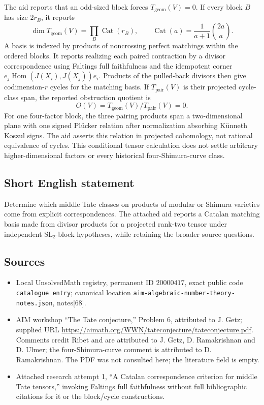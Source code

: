 \documentclass[11pt]{article}
\begin{document}
The aid reports that an odd-sized block forces \(T_{\mathrm{geom}}(V)=0\). If every block \(B\) has size \(2r_B\), it reports
\[
\dim T_{\mathrm{geom}}(V)=\prod_B\operatorname{Cat}(r_B),\qquad
\operatorname{Cat}(a)=\frac1{a+1}\binom{2a}{a}.
\]
A basis is indexed by products of noncrossing perfect matchings within the ordered blocks. It reports realizing each paired contraction by a divisor correspondence using Faltings full faithfulness and the idempotent corner \(e_j\operatorname{Hom}(J(X_i),J(X_j))e_i\). Products of the pulled-back divisors then give codimension-\(r\) cycles for the matching basis. If \(T_{\mathrm{pair}}(V)\) is their projected cycle-class span, the reported obstruction quotient is
\[
O(V)=T_{\mathrm{geom}}(V)/T_{\mathrm{pair}}(V)=0.
\]
For one four-factor block, the three pairing products span a two-dimensional plane with one signed Pl\"ucker relation after normalization absorbing K\"unneth Koszul signs. The aid asserts this relation in projected cohomology, not rational equivalence of cycles. This conditional tensor calculation does not settle arbitrary higher-dimensional factors or every historical four-Shimura-curve class.
\subsection{Short English statement}
Determine which middle Tate classes on products of modular or Shimura varieties come from explicit correspondences. The attached aid reports a Catalan matching basis made from divisor products for a projected rank-two tensor under independent \(\mathrm{SL}_2\)-block hypotheses, while retaining the broader source questions.
\subsection{Sources}
\begin{itemize}
\item Local UnsolvedMath registry, permanent ID \(20000417\), exact public code \texttt{catalogue entry}; canonical location \texttt{aim-algebraic-number-theory-notes.json}, notes[68].
\item AIM workshop ``The Tate conjecture,'' Problem 6, attributed to J. Getz; supplied URL \url{https://aimath.org/WWN/tateconjecture/tateconjecture.pdf}. Comments credit Ribet and are attributed to J. Getz, D. Ramakrishnan and D. Ulmer; the four-Shimura-curve comment is attributed to D. Ramakrishnan. The PDF was not consulted here; the literature field is empty.
\item Attached research attempt 1, ``A Catalan correspondence criterion for middle Tate tensors,'' invoking Faltings full faithfulness without full bibliographic citations for it or the block/cycle constructions.
\end{itemize}
\end{document}
